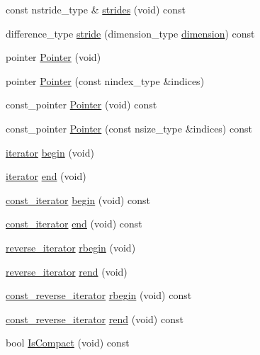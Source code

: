 \begin{DoxyCompactItemize}
\item 
const nstride\+\_\+type \& \hyperlink{classvct_dynamic_n_array_ref_owner_ac7334601eafc3a0ec9d7801ade2fbf6f}{strides} (void) const 
\item 
difference\+\_\+type \hyperlink{classvct_dynamic_n_array_ref_owner_aea8601ea64fa3efad1cb5deee56e46ab}{stride} (dimension\+\_\+type \hyperlink{classvct_dynamic_n_array_ref_owner_ade9ee32661cd3ff7408e93b15ba7e1db}{dimension}) const 
\item 
pointer \hyperlink{classvct_dynamic_n_array_ref_owner_a24bf06f05b30a06407ac8399c6581373}{Pointer} (void)
\item 
pointer \hyperlink{classvct_dynamic_n_array_ref_owner_ab29a02a5fc944eea7205ca6742d8d456}{Pointer} (const nindex\+\_\+type \&indices)
\item 
const\+\_\+pointer \hyperlink{classvct_dynamic_n_array_ref_owner_a18ab69a03de4c71cc0b8a314797fd301}{Pointer} (void) const 
\item 
const\+\_\+pointer \hyperlink{classvct_dynamic_n_array_ref_owner_a2bf84bf6df81ab8c7fafc37668116582}{Pointer} (const nsize\+\_\+type \&indices) const 
\item 
\hyperlink{classvct_dynamic_n_array_ref_owner_a9d68370074a5320a30354e700207ad71}{iterator} \hyperlink{classvct_dynamic_n_array_ref_owner_a6756bce7cfa74acc5bf89a12351a2766}{begin} (void)
\item 
\hyperlink{classvct_dynamic_n_array_ref_owner_a9d68370074a5320a30354e700207ad71}{iterator} \hyperlink{classvct_dynamic_n_array_ref_owner_aaa6cdbf243193da807e44199fc91624d}{end} (void)
\item 
\hyperlink{classvct_dynamic_n_array_ref_owner_ab6652472746656a9be2de178295fd80b}{const\+\_\+iterator} \hyperlink{classvct_dynamic_n_array_ref_owner_a11a054a371e6b27ef7cd63ef7db43ae5}{begin} (void) const 
\item 
\hyperlink{classvct_dynamic_n_array_ref_owner_ab6652472746656a9be2de178295fd80b}{const\+\_\+iterator} \hyperlink{classvct_dynamic_n_array_ref_owner_affef349371877a21b3f8fc6525d6cf71}{end} (void) const 
\item 
\hyperlink{classvct_dynamic_n_array_ref_owner_aabd87b1efc3a18043c6dac3d8017be59}{reverse\+\_\+iterator} \hyperlink{classvct_dynamic_n_array_ref_owner_a835e4e3ea11e7379cfe19cbb44acce8a}{rbegin} (void)
\item 
\hyperlink{classvct_dynamic_n_array_ref_owner_aabd87b1efc3a18043c6dac3d8017be59}{reverse\+\_\+iterator} \hyperlink{classvct_dynamic_n_array_ref_owner_ab55db300eee83a3cf69be606eedb5374}{rend} (void)
\item 
\hyperlink{classvct_dynamic_n_array_ref_owner_ade444e0883b2420a8a113171b6e49bf4}{const\+\_\+reverse\+\_\+iterator} \hyperlink{classvct_dynamic_n_array_ref_owner_a6b60d7fa73fb67fb9af7af6c46217361}{rbegin} (void) const 
\item 
\hyperlink{classvct_dynamic_n_array_ref_owner_ade444e0883b2420a8a113171b6e49bf4}{const\+\_\+reverse\+\_\+iterator} \hyperlink{classvct_dynamic_n_array_ref_owner_ae639994097947c479cd12ac4e44d3450}{rend} (void) const 
\item 
bool \hyperlink{classvct_dynamic_n_array_ref_owner_a0077d4530e6c48c2fbdcd5994dc808d0}{Is\+Compact} (void) const 
\end{DoxyCompactItemize}
